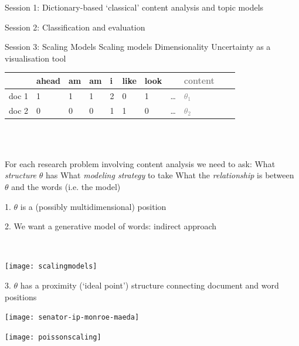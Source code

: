 \documentclass{mediumfoils}
\author{\textbf{Will Lowe} (University of Mannheim)}
\date{}
\begin{document}
\maketitle


Session 1: Dictionary-based `classical' content analysis and topic models

Session 2: Classification and evaluation

Session 3: 
\ita
\itm Scaling Models
\ita
\itm Scaling models
\itm Dimensionality
\itm Uncertainty
\itm as a visualisation tool
\itz
\itz


\begin{center}
\small
\begin{tabular}{rllllllllll}\toprule
        & ahead & am & am & i & like & look &  & \textcolor{gray}{content} \\ \midrule
doc 1  & 1     & 1  & 1  & 2 & 0    & 1    & \ldots & \textcolor{gray}{$\theta_1$} \\
doc 2  & 0     & 0  & 0  & 1 & 1    & 0    & \ldots & \textcolor{gray}{$\theta_2$} \\ \bottomrule
\end{tabular} 
\normalsize
\end{center}
~\\\

For each research problem involving content analysis we need to ask:
\ita
\itm What \textit{structure} $\theta$ has
\itm What \textit{modeling strategy} to take
\itm What the \textit{relationship} is between $\theta$ and the words (i.e. the model)
\itz


1. $\theta$ is a (possibly multidimensional) position

2. We want a generative model of words: indirect approach

~\\
\centerline{\texttt{[image: scalingmodels]}}


3. $\theta$ has a proximity (`ideal point') structure connecting document and word positions

\newpage 


\centerline{\texttt{[image: senator-ip-monroe-maeda]}}




\centerline{\texttt{[image: poissonscaling]}}
\end{document}
